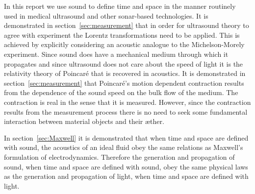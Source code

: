 \documentclass[10pt, fleqn,final,showtrims,oldfontcommands, article,a4paper,oneside]{memoir} %
\newcommand{\secref}[1]{section~\ref{sec:#1}}
\newcommand{\aether}{\ae ther}
\newcommand{\Poincare}{Poincar{\'e}\xspace}
\begin{document}






In this report we use sound to define time and space 
in the manner  routinely used in medical ultrasound and other sonar-based technologies.
It is demonstrated in section~\ref{sec:measurement} that in order for ultrasound theory 
to agree with experiment the Lorentz transformations need to be applied.
This is achieved by explicitly considering an acoustic analogue to the Michelson-Morely experiment.
Since sound  does have a mechanical medium through which it propagates and since ultrasound does not care about the speed of light
it is the relativity theory of \Poincare that is recovered in acoustics.
It is demonstrated in  \secref{measurement} that \Poincare's motion dependent contraction 
results from the dependence of the  sound speed on the bulk flow of the medium.
The contraction is real in the sense that it is measured.
However, since the contraction results from the measurement process there is 
no need to seek some fundamental interaction between material objects and their \aether.

In section~\ref{sec:Maxwell} it is demonstrated that  when time and space are defined with sound, 
the acoustics of an ideal fluid obey the same relations as Maxwell's formulation of electrodynamics.
Therefore the generation and propagation of sound,  when time and space are defined with  sound,
obey the same physical laws as the generation and propagation of light,  when time and space are defined with light.
\end{document}
